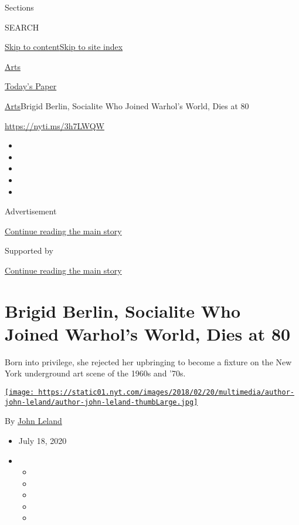 Sections

SEARCH

\protect\hyperlink{site-content}{Skip to
content}\protect\hyperlink{site-index}{Skip to site index}

\href{https://www.nytimes.com/section/arts}{Arts}

\href{https://myaccount.nytimes.com/auth/login?response_type=cookie\&client_id=vi}{}

\href{https://www.nytimes.com/section/todayspaper}{Today's Paper}

\href{/section/arts}{Arts}\textbar{}Brigid Berlin, Socialite Who Joined
Warhol's World, Dies at 80

\url{https://nyti.ms/3h7LWQW}

\begin{itemize}
\item
\item
\item
\item
\item
\end{itemize}

Advertisement

\protect\hyperlink{after-top}{Continue reading the main story}

Supported by

\protect\hyperlink{after-sponsor}{Continue reading the main story}

\hypertarget{brigid-berlin-socialite-who-joined-warhols-world-dies-at-80}{%
\section{Brigid Berlin, Socialite Who Joined Warhol's World, Dies at
80}\label{brigid-berlin-socialite-who-joined-warhols-world-dies-at-80}}

Born into privilege, she rejected her upbringing to become a fixture on
the New York underground art scene of the 1960s and '70s.

\href{https://www.nytimes.com/by/john-leland}{\texttt{[image: https://static01.nyt.com/images/2018/02/20/multimedia/author-john-leland/author-john-leland-thumbLarge.jpg]}}

By \href{https://www.nytimes.com/by/john-leland}{John Leland}

\begin{itemize}
\item
  July 18, 2020
\item
  \begin{itemize}
  \item
  \item
  \item
  \item
  \item
  \end{itemize}
\end{itemize}

